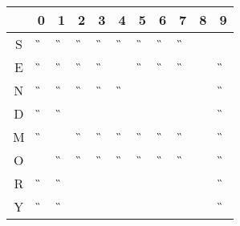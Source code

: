 \begin{tabular}{|c|c|c|c|c|c|c|c|c|c|c|}\hline
  & 0 & 1 & 2 & 3 & 4 & 5 & 6 & 7 & 8 & 9 \\ \hline
S &\G &\G &\G &\G &\G &\G &\G &\G &\Y &\A \\ \hline
E &\G &\G &\G &\G &\A &\G &\G &\G &\Y &\G \\ \hline
N &\G &\G &\G &\G &\G &\F &\X &\X &\Y &\G \\ \hline
D &\G &\G &\X &\X &\X &\X &\X &\X &\F &\G \\ \hline
M &\G &\A &\G &\G &\G &\G &\G &\G &\Y &\G \\ \hline
O &\A &\G &\G &\G &\G &\G &\G &\G &\Y &\G \\ \hline
R &\G &\G &\X &\X &\X &\X &\X &\X &\F &\G \\ \hline
Y & \G&\G &\F &\X &\X &\X &\X &\X &\Y &\G \\ \hline
\end{tabular}
